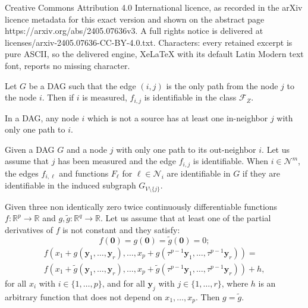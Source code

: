 \documentclass[10pt,a4paper]{amsart}
\newcommand{\Fone}{\mathcal{F}_Z}
\newcommand{\NN}{\mathcal{N}}
\newcommand{\R}{\mathbb R}
\newcommand{\y}{\mathbf{y}}
\newcommand{\zero}{\mathbf{0}}
\begin{document}
Creative Commons Attribution 4.0 International licence, as recorded in the arXiv licence metadata for this exact version and shown on the abstract page https://arxiv.org/abs/2405.07636v3. A full rights notice is delivered at licenses/arxiv-2405.07636-CC-BY-4.0.txt. Characters: every retained excerpt is pure ASCII, so the delivered engine, XeLaTeX with its default Latin Modern text font, reports no missing character.
\begin{lemma}\label{lemma:sinks}
Let $G$ be a DAG such that the edge $(i,j)$ is the only path from the node $j$ to the node $i$. Then if $i$ is measured, $f_{i,j}$ is identifiable in the class $\Fone$.
\end{lemma}

\begin{lemma}\label{lemma:unique_path}
    In a DAG, any node $i$ which is not a source has at least one in-neighbor $j$ with only one path to $i$.   
\end{lemma}

\begin{lemma}\label{lemma:removal_node}
    Given a DAG $G$ and a node $j$ with only one path to its out-neighbor $i$. Let us assume that $j$ has been measured and the edge $f_{i,j}$ is identifiable. When $i\in \NN^m$, the edges $f_{i,\ell}$ and functions $F_\ell$ for $\ell\in\NN_i$ are identifiable in $G$ if they are identifiable in the induced subgraph   
    $G_{V\setminus\{ j\}}$.
\end{lemma}

\begin{lemma}\label{lemma:multivariate_sum}
Given three non identically zero twice continuously differentiable functions $f:\R^p\to \R$ and $g,\tilde g:\R^q\to\R$. Let us assume that at least one of the partial derivatives of $f$ is not constant and they satisfy:
$$
f(\zero)= g(\zero)= \tilde g(\zero)=0;
$$
\vspace{-7mm}
\begin{multline}\label{eq:statement_lemma_function_h}
f(x_1\!+\!g(\y_1,\ldots,\y_r),\ldots,x_p\!+\!g(\tau^{p-1}\y_1,\ldots,\tau^{p-1}\y_r))=\\     
f(x_1\!+\!\tilde g(\y_1,\ldots,\y_r),\ldots,x_p\!+\!\tilde g(\tau^{p-1}\y_1,\ldots,\tau^{p-1}\y_r))+h,
\end{multline}
for all $x_i$ with $i\in \{1,\ldots,p\}$, and for all $\y_j$ with $j\in \{1,\ldots,r\}$, where $h$ is an arbitrary function that does not depend on $x_1,\ldots,x_p$.
Then $g=\tilde g$.
\end{lemma}
\end{document}
